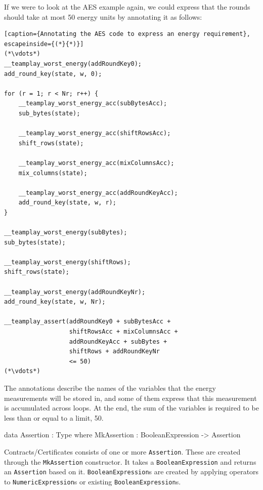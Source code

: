         \newpage
        
        If we were to look at the AES example again, we could express that the rounds should take at most 50 energy units by annotating it as follows:
        \begin{lstlisting}[caption={Annotating the AES code to express an energy requirement}, escapeinside={(*}{*)}]
(*\vdots*)
__teamplay_worst_energy(addRoundKey0);
add_round_key(state, w, 0);

for (r = 1; r < Nr; r++) {
    __teamplay_worst_energy_acc(subBytesAcc);
    sub_bytes(state);
    
    __teamplay_worst_energy_acc(shiftRowsAcc);
    shift_rows(state);
    
    __teamplay_worst_energy_acc(mixColumnsAcc);
    mix_columns(state);
    
    __teamplay_worst_energy_acc(addRoundKeyAcc);
    add_round_key(state, w, r);
}

__teamplay_worst_energy(subBytes);
sub_bytes(state);

__teamplay_worst_energy(shiftRows);
shift_rows(state);

__teamplay_worst_energy(addRoundKeyNr);
add_round_key(state, w, Nr);

__teamplay_assert(addRoundKey0 + subBytesAcc +
                  shiftRowsAcc + mixColumnsAcc +
                  addRoundKeyAcc + subBytes +
                  shiftRows + addRoundKeyNr
                  <= 50)
(*\vdots*)
        \end{lstlisting}
        
        The annotations describe the names of the variables that the energy measurements will be stored in, and some of them express that this measurement is accumulated across loops. At the end, the sum of the variables is required to be less than or equal to a limit, 50.
    
        \begin{code}[label={des:assertion}, caption={The \texttt{Assertion} data type}]
            data Assertion  : Type where
                MkAssertion : BooleanExpression -> Assertion
        \end{code}
    
        Contracts/Certificates consists of one or more \texttt{Assertion}.
        These are created through the \texttt{MkAssertion} constructor. It takes a \texttt{BooleanExpression} and returns an \texttt{Assertion} based on it. \texttt{BooleanExpression}s are created by applying operators to \texttt{NumericExpression}s or existing \texttt{BooleanExpression}s.
    

